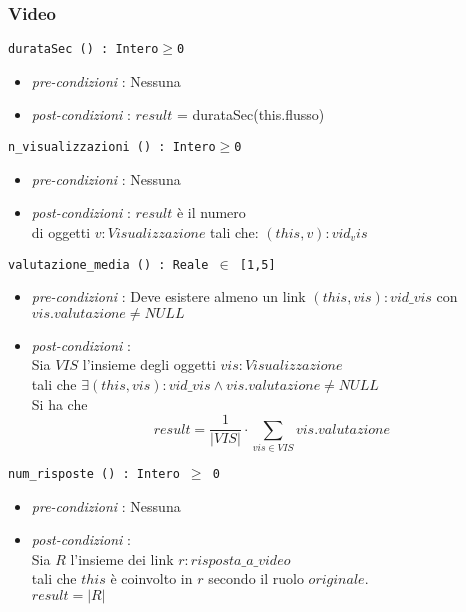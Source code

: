 \documentclass[12pt, letterpaper]{article}
\newcommand{\code}[1]{\colorbox{light-gray}{\texttt{#1}}}
\newcommand{\id}{{\hphantom{ident}}}
\begin{document}
\subsubsection{Video}
\code{durataSec () : Intero$\ge$0}\begin{itemize}
    \item \textit{pre-condizioni} : Nessuna
    \item \textit{post-condizioni} : $result$ = durataSec(this.flusso)
\end{itemize}
\code{n\_visualizzazioni () : Intero$\ge$0}\begin{itemize}
    \item \textit{pre-condizioni} : Nessuna
    \item \textit{post-condizioni} : $result$ è il numero \\di oggetti $v:Visualizzazione$ tali che:
          $(this, v): vid_vis$
\end{itemize}
\code{valutazione\_media () : Reale $\in$ [1,5]}\begin{itemize}
    \item \textit{pre-condizioni} : Deve esistere almeno un link $(this,vis):vid\_vis$ con $vis.valutazione\ne NULL$
    \item \textit{post-condizioni} :\\
          \id Sia $VIS$ l'insieme degli oggetti $vis:Visualizzazione$
          \\\id tali che $\exists(this,vis):vid\_vis\land vis.valutazione\ne NULL$\\
          \id Si ha che $$ result = \dfrac{1}{|VIS|}\cdot \sum_{vis\in VIS}vis.valutazione$$
\end{itemize}
\code{num\_risposte () : Intero $\ge$ 0}\begin{itemize}
    \item \textit{pre-condizioni} : Nessuna
    \item  \textit{post-condizioni} :\\
          \id  Sia $R$ l'insieme dei link $r:risposta\_a\_video$\\
          \id tali che $this$ è coinvolto in $r$ secondo il ruolo $originale$.\\
          \id $result = |R|$
\end{itemize}
\newpage
\end{document}
